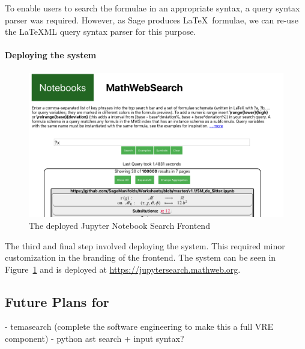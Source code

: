 To enable users to search the formulae in an appropriate syntax, a query syntax parser was required. 
However, as Sage produces \LaTeX\ formulae, we can re-use the {\LaTeX}ML query syntax parser for this purpose. 

\paragraph{Deploying the system}

\begin{figure}[ht]
  \includegraphics[width=\textwidth]{mwsnotebookfront.png}
  \caption{The deployed Jupyter Notebook Search Frontend}\label{fig:mwsnotebookfront}
\end{figure}

The third and final step involved deploying the system.
This required minor customization in the branding of the frontend. 
The system can be seen in Figure~\ref{fig:mwsnotebookfront} and is deployed at \url{https://jupytersearch.mathweb.org}.


\begin{oldpart}{}
\subsection{Future Plans for \MWS}

- temasearch (complete the software engineering to make this a full  VRE component)
- python ast search + input syntax?
\end{oldpart}



